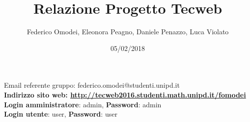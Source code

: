 
\title{\textbf{Relazione Progetto Tecweb}}
\author {Federico Omodei, Eleonora Peagno, Daniele Penazzo, Luca Violato}
\date{05/02/2018}


\begin{titlepage}
\thispagestyle{empty}
\vfill
\maketitle

\vfill

\begin{center}
Email referente gruppo: federico.omodei@studenti.unipd.it\\
\vfill
\textbf{Indirizzo sito web: \url{http://tecweb2016.studenti.math.unipd.it/fomodei}}\\
\textbf{Login amministratore}: admin, \textbf{Password}: admin \\
\textbf{Login utente}: user, \textbf{Password}: user
\vfill
\end{center}
\end{titlepage}

\pagebreak

\tableofcontents

\pagebreak



\pagebreak



\pagebreak



\pagebreak



\pagebreak





